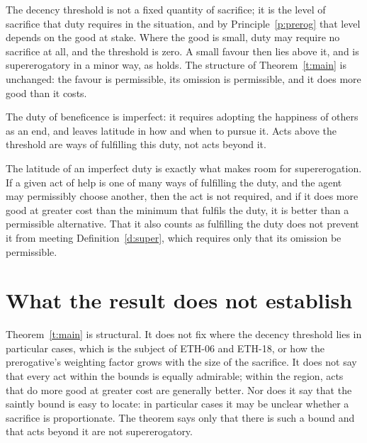 \documentclass{situationist-preprint}
\begin{document}
\begin{reply}
The decency threshold is not a fixed quantity of sacrifice; it is the level of sacrifice that duty requires in the situation, and by Principle~\ref{p:prerog} that level depends on the good at stake. Where the good is small, duty may require no sacrifice at all, and the threshold is zero. A small favour then lies above it, and is supererogatory in a minor way, as \citet{Heyd1982} holds. The structure of Theorem~\ref{t:main} is unchanged: the favour is permissible, its omission is permissible, and it does more good than it costs.
\end{reply}

\begin{objection}\label{o:kant}
The duty of beneficence is imperfect: it requires adopting the happiness of others as an end, and leaves latitude in how and when to pursue it. Acts above the threshold are ways of fulfilling this duty, not acts beyond it.
\end{objection}

\begin{reply}
The latitude of an imperfect duty is exactly what makes room for supererogation. If a given act of help is one of many ways of fulfilling the duty, and the agent may permissibly choose another, then the act is not required, and if it does more good at greater cost than the minimum that fulfils the duty, it is better than a permissible alternative. That it also counts as fulfilling the duty does not prevent it from meeting Definition~\ref{d:super}, which requires only that its omission be permissible.
\end{reply}

\section{What the result does not establish}

Theorem~\ref{t:main} is structural. It does not fix where the decency threshold lies in particular cases, which is the subject of ETH-06 and ETH-18, or how the prerogative's weighting factor grows with the size of the sacrifice. It does not say that every act within the bounds is equally admirable; within the region, acts that do more good at greater cost are generally better. Nor does it say that the saintly bound is easy to locate: in particular cases it may be unclear whether a sacrifice is proportionate. The theorem says only that there is such a bound and that acts beyond it are not supererogatory.
\end{document}

